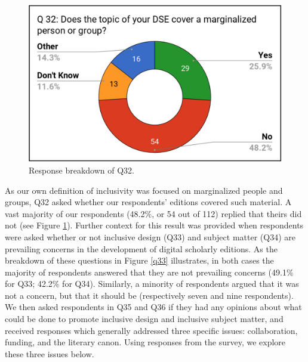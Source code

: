 \begin{paper}
\begin{figure}[htb!]
\includegraphics[width=\textwidth]{media/martinez6.png}
\caption{Response breakdown of Q32.}
\label{q32}
\end{figure}

As our own definition of inclusivity was focused on marginalized people
and groups, Q32 asked whether our respondents' editions covered such
material. A vast majority of our respondents (48.2\%, or 54 out of 112)
replied that theirs did not (see Figure \ref{q32}). Further context for this result was provided when respondents were asked whether or not inclusive
design (Q33) and subject matter (Q34) are prevailing concerns in the
development of digital scholarly editions. As the breakdown of these
questions in Figure \ref{q33} illustrates, in both cases the majority of
respondents answered that they are not prevailing concerns (49.1\% for
Q33; 42.2\% for Q34). Similarly, a minority of respondents argued that
it was not a concern, but that it should be (respectively seven and nine
respondents). We then asked respondents in Q35 and Q36 if they had any
opinions about what could be done to promote inclusive design and
inclusive subject matter, and received responses which generally
addressed three specific issues: collaboration, funding, and the
literary canon. Using responses from the survey, we explore these three
issues below.


\end{paper}
